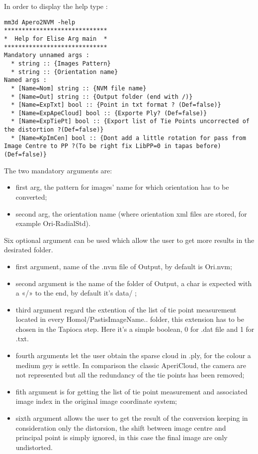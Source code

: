 In order to display the help type :

\begin{verbatim}
mm3d Apero2NVM -help
*****************************
*  Help for Elise Arg main  *
*****************************
Mandatory unnamed args : 
  * string :: {Images Pattern}
  * string :: {Orientation name}
Named args : 
  * [Name=Nom] string :: {NVM file name}
  * [Name=Out] string :: {Output folder (end with /)}
  * [Name=ExpTxt] bool :: {Point in txt format ? (Def=false)}
  * [Name=ExpApeCloud] bool :: {Exporte Ply? (Def=false)}
  * [Name=ExpTiePt] bool :: {Export list of Tie Points uncorrected of the distortion ?(Def=false)}
  * [Name=KpImCen] bool :: {Dont add a little rotation for pass from Image Centre to PP ?(To be right fix LibPP=0 in tapas before)(Def=false)}
\end{verbatim}

The two mandatory arguments are:
\begin{itemize}
 \item  first arg, the pattern for images’ name for which orientation has to be converted;
 \item  second arg, the orientation name (where orientation xml files are stored, for example Ori-RadialStd).
\end{itemize}

Six optional argument can be used which allow the user to get more results in the desirated folder.
\begin{itemize}
 \item first argument, name of the .nvm file of Output, by default is Ori.nvm;
 \item second argument is the name of the folder of Output, a char is expected with a «/» to the end, by default it's data/ ;
 \item third argument regard the extention of the list of tie point measurement located in every Homol/PastisImageName.. folder, this extension has to be chosen in the Tapioca step. Here it's a simple boolean, 0 for .dat file and 1 for .txt.

 \item  fourth arguments let the user obtain the sparse cloud in .ply, for the colour a medium gey is settle. In comparison the classic AperiCloud, the camera are not represented but all the redundancy of the tie points has been removed;
 \item  fith argument is for getting the list of tie point measurement and associated image index in the original image coordinate system;
 \item  sixth argument allows the user to get the result of the conversion keeping in consideration only the distorsion, the shift between image centre and principal point is simply ignored, in this case the final image are only undistorted.
\end{itemize}

